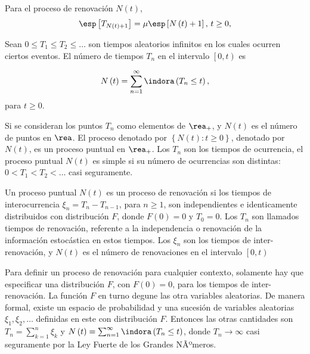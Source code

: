 \begin{Coro}
Para el proceso de renovaci\'on $N\left(t\right)$,
\begin{eqnarray*}
\esp\left[T_{N\left(t\right)+1}\right]=\mu\esp\left[N\left(t\right)+1\right]\textrm{,  }t\geq0,
\end{eqnarray*}  
\end{Coro}


\begin{Def}%
Sean $0\leq T_{1}\leq T_{2}\leq \ldots$ son tiempos aleatorios infinitos en los cuales ocurren ciertos eventos. El n\'umero de tiempos $T_{n}$ en el intervalo $\left[0,t\right)$ es

\begin{eqnarray}
N\left(t\right)=\sum_{n=1}^{\infty}\indora\left(T_{n}\leq t\right),
\end{eqnarray}
para $t\geq0$.
\end{Def}

Si se consideran los puntos $T_{n}$ como elementos de $\rea_{+}$, y $N\left(t\right)$ es el n\'umero de puntos en $\rea$. El proceso denotado por $\left\{N\left(t\right):t\geq0\right\}$, denotado por $N\left(t\right)$, es un proceso puntual en $\rea_{+}$. Los $T_{n}$ son los tiempos de ocurrencia, el proceso puntual $N\left(t\right)$ es simple si su n\'umero de ocurrencias son distintas: $0<T_{1}<T_{2}<\ldots$ casi seguramente.

\begin{Def}
Un proceso puntual $N\left(t\right)$ es un proceso de renovaci\'on si los tiempos de interocurrencia $\xi_{n}=T_{n}-T_{n-1}$, para $n\geq1$, son independientes e identicamente distribuidos con distribuci\'on $F$, donde $F\left(0\right)=0$ y $T_{0}=0$. Los $T_{n}$ son llamados tiempos de renovaci\'on, referente a la independencia o renovaci\'on de la informaci\'on estoc\'astica en estos tiempos. Los $\xi_{n}$ son los tiempos de inter-renovaci\'on, y $N\left(t\right)$ es el n\'umero de renovaciones en el intervalo $\left[0,t\right)$
\end{Def}


\begin{Note}
Para definir un proceso de renovaci\'on para cualquier contexto, solamente hay que especificar una distribuci\'on $F$, con $F\left(0\right)=0$, para los tiempos de inter-renovaci\'on. La funci\'on $F$ en turno degune las otra variables aleatorias. De manera formal, existe un espacio de probabilidad y una sucesi\'on de variables aleatorias $\xi_{1},\xi_{2},\ldots$ definidas en este con distribuci\'on $F$. Entonces las otras cantidades son $T_{n}=\sum_{k=1}^{n}\xi_{k}$ y $N\left(t\right)=\sum_{n=1}^{\infty}\indora\left(T_{n}\leq t\right)$, donde $T_{n}\rightarrow\infty$ casi seguramente por la Ley Fuerte de los Grandes NÃºmeros.
\end{Note}

